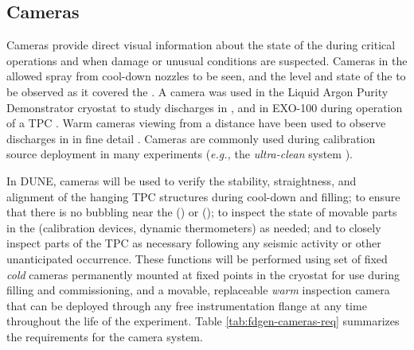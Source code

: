 \subsection{Cameras}
\label{sec:fdgen-slow-cryo-cameras}

Cameras provide direct visual information about the state of the
 during critical operations and when damage or unusual
conditions are suspected.  Cameras in the   \dual allowed spray from cool-down
nozzles to be seen, and the level and state of the \lar to be
observed as it covered the  \cite{Murphy:20170516}.  A camera was
used in the Liquid Argon Purity Demonstrator
cryostat\cite{Adamowski:2014daa} to study  discharges in
\lar, and in EXO-100 during operation of a TPC
\cite{Delaquis:2013hva}.  Warm cameras viewing \lar from a distance
have been used to observe  discharges in \lar in
fine detail \cite{Auger:2015xlo}.  Cameras are commonly used during
calibration source deployment in many experiments ({\em e.g.,} the
\kamland \textit{ultra-clean} system \cite{Banks:2014hra}).

In DUNE, cameras will be used to verify the stability, straightness,
and alignment of the hanging TPC structures during cool-down and
filling; to ensure that there is no bubbling near the 
(\single) or  (\dual); to inspect the
state of movable parts in the  (calibration devices, dynamic
thermometers) as needed; and to closely inspect parts of the TPC as
necessary following any seismic activity or other unanticipated
occurrence.  These functions will be performed using set of fixed
\textit{cold} cameras permanently mounted at fixed points in the cryostat
for use during filling and commissioning, and a movable, replaceable
\textit{warm} inspection camera that can be deployed through any free
instrumentation flange at any time throughout the life of the
experiment.  Table \ref{tab:fdgen-cameras-req} summarizes the
requirements for the camera system.

